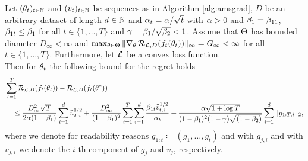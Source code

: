 \begin{theorem}\label{theorem:amsgrad}
Let $(\theta_t)_{t\in\operatorname{\mathbb{N}}}$ and $(v_t)_{t\in\operatorname{\mathbb{N}}}$ be sequences as in Algorithm \ref{alg:amsgrad}, $D$ be an arbitrary dataset of length $d\in\operatorname{\mathbb{N}}$ and $\alpha_t = \alpha/\sqrt{t}$ with $\alpha>0$ and $\beta_1 = \beta_{11}$, $\beta_{1t}\leq \beta_1$ for all $t \in \{1,\ldots, T\}$ and $\operatorname{\gamma} = \beta_1/\sqrt{\beta_{2}} < 1$. Assume that $\operatorname{\Theta}$ has bounded diameter $D_{\infty}<\infty$ and $\max_{\theta\in\operatorname{\Theta}}\|\nabla_{\theta}\operatorname{\mathcal{R}}_{\operatorname{\mathcal{L}}, D}(f_t(\theta_t))\|_{\infty}= G_{\infty}<\infty$ for all $t \in \{1,\ldots, T\}$. Furthermore, let $\operatorname{\mathcal{L}}$ be a convex loss function.\\
Then for $\theta_t$ the following bound for the regret holds
\begin{align*}
&\sum_{t=1}^T \operatorname{\mathcal{R}}_{\operatorname{\mathcal{L}}, D}(f_t(\theta_t)) - \operatorname{\mathcal{R}}_{\operatorname{\mathcal{L}}, D}(f_t(\theta^{\ast}))\\
&\quad\leq \frac{D_{\infty}^2\sqrt{T}}{2\alpha(1-\beta_1)} \sum_{i=1}^d \widehat{v}_{T,i}^{1/2} + \frac{D_{\infty}^2}{(1-\beta_1)^2} \sum_{t=1}^T \sum_{i=1}^d \frac{\beta_{1t}\widehat{v}_{t,i}^{1/2}}{\alpha_t}+ \frac{\alpha\sqrt{1 + \log T}}{(1-\beta_1)^2(1-\operatorname{\gamma})\sqrt{(1-\beta_2)}}\sum_{i=1}^d \|g_{1:T,i}\|_2,
\end{align*}
where we denote for readability reasons $g_{1:t}\coloneqq(g_1,\ldots, g_t)$ and with $g_{j,i}$ and with $v_{j,i}$ we denote the $i$-th component of $g_j$ and $v_j$, respectively.
\end{theorem}

